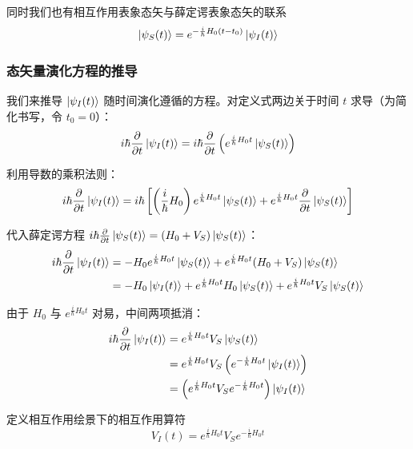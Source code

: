 同时我们也有相互作用表象态矢与薛定谔表象态矢的联系
\begin{equation}
	\ket{\psi_S(t)} = e^{-\frac{i}{\hbar} H_0 (t-t_0)} \ket{\psi_I(t)}
\end{equation}

\subsubsection{态矢量演化方程的推导}
我们来推导 $\ket{\psi_I(t)}$ 随时间演化遵循的方程。对定义式两边关于时间 $t$ 求导（为简化书写，令 $t_0 = 0$）：
\begin{equation}
	i\hbar \frac{\partial}{\partial t} \ket{\psi_I(t)} = i\hbar \frac{\partial}{\partial t} \left( e^{\frac{i}{\hbar} H_0 t} \ket{\psi_S(t)} \right)
\end{equation}

利用导数的乘积法则：
\begin{equation}
	i\hbar \frac{\partial}{\partial t} \ket{\psi_I(t)} = i\hbar \left[ \left( \frac{i}{\hbar} H_0 \right) e^{\frac{i}{\hbar} H_0 t} \ket{\psi_S(t)} + e^{\frac{i}{\hbar} H_0 t} \frac{\partial}{\partial t} \ket{\psi_S(t)} \right]
\end{equation}

代入薛定谔方程 $i\hbar \frac{\partial}{\partial t} \ket{\psi_S(t)} = (H_0 + V_S) \ket{\psi_S(t)}$：
\begin{align}
	i\hbar \frac{\partial}{\partial t} \ket{\psi_I(t)} &= -H_0 e^{\frac{i}{\hbar} H_0 t} \ket{\psi_S(t)} + e^{\frac{i}{\hbar} H_0 t} (H_0 + V_S) \ket{\psi_S(t)} \\
	&= -H_0 \ket{\psi_I(t)} + e^{\frac{i}{\hbar} H_0 t} H_0 \ket{\psi_S(t)} + e^{\frac{i}{\hbar} H_0 t} V_S \ket{\psi_S(t)}
\end{align}

由于 $H_0$ 与 $e^{\frac{i}{\hbar} H_0 t}$ 对易，中间两项抵消：
\begin{align}
	i\hbar \frac{\partial}{\partial t} \ket{\psi_I(t)} &= e^{\frac{i}{\hbar} H_0 t} V_S \ket{\psi_S(t)} \\
	&= e^{\frac{i}{\hbar} H_0 t} V_S \left( e^{-\frac{i}{\hbar} H_0 t} \ket{\psi_I(t)} \right) \\
	&= \left( e^{\frac{i}{\hbar} H_0 t} V_S e^{-\frac{i}{\hbar} H_0 t} \right) \ket{\psi_I(t)}
\end{align}

定义相互作用绘景下的相互作用算符 
\begin{equation}
	V_I(t) = e^{\frac{i}{\hbar} H_0 t} V_S e^{-\frac{i}{\hbar} H_0 t}
\end{equation}

